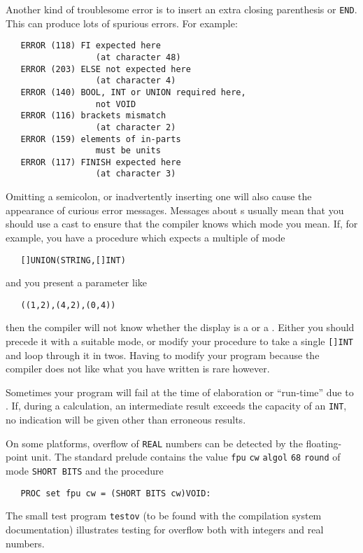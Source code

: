 Another kind of troublesome error is to insert an extra closing
parenthesis or \verb|END|. This can produce lots of spurious errors.
For example:
\begin{verbatim}
   ERROR (118) FI expected here
                  (at character 48)
   ERROR (203) ELSE not expected here
                  (at character 4)
   ERROR (140) BOOL, INT or UNION required here,
                  not VOID
   ERROR (116) brackets mismatch
                  (at character 2)
   ERROR (159) elements of in-parts
                  must be units
   ERROR (117) FINISH expected here
                  (at character 3)
\end{verbatim}
\noindent
Omitting a semicolon, or inadvertently inserting one will also cause
the appearance of curious error messages. Messages about
s usually mean that you should use a
cast to ensure that the compiler knows which mode you mean. If, for
example, you have a procedure which expects a multiple of mode
\begin{verbatim}
   []UNION(STRING,[]INT)
\end{verbatim}
\noindent
and you present a parameter like
\begin{verbatim}
   ((1,2),(4,2),(0,4))
\end{verbatim}
\noindent
then the compiler will not know whether the display is a
 or a
.  Either you should precede
it with a suitable mode, or modify your procedure to take a single
\verb|[]INT| and loop through it in twos.  Having to modify your
program because the compiler does not like what you have written is
rare however.

Sometimes your program will fail at the time of elaboration or
``run-time'' due to . If,
during a calculation, an intermediate result exceeds the capacity of an
\verb|INT|, no indication will be given other than erroneous results.

On some platforms, overflow of \verb|REAL| numbers can be detected by the floating-point
unit. The standard prelude contains the value \verb|fpu| \verb|cw|
\verb|algol| \verb|68| \verb|round| of mode \verb|SHORT BITS| and the
procedure
\begin{verbatim}
   PROC set fpu cw = (SHORT BITS cw)VOID:
\end{verbatim}
\noindent
The small test program \verb|testov| (to be found with the
 compilation system documentation)
illustrates testing for overflow both with integers and real numbers.

